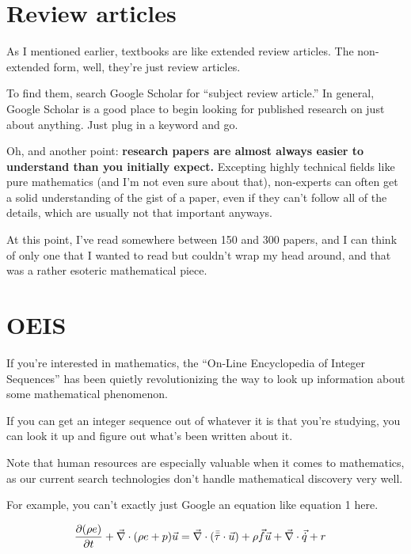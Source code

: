 \section{Review articles}

As I mentioned earlier, textbooks are like extended review articles. The
non-extended form, well, they're just review articles.

To find them, search Google Scholar for ``subject review article.'' In general,
Google Scholar is a good place to begin looking for published research on just
about anything. Just plug in a keyword and go.

Oh, and another point: \textbf{research papers are almost always easier to
  understand than you initially expect.} Excepting highly technical fields like
pure mathematics (and I'm not even sure about that), non-experts can often get a
solid understanding of the gist of a paper, even if they can't follow all of the
details, which are usually not that important anyways.

At this point, I've read somewhere between 150 and 300 papers, and I can think
of only one that I wanted to read but couldn't wrap my head around, and that was
a rather esoteric mathematical piece.

\section{OEIS}

If you're interested in mathematics, the ``On-Line Encyclopedia of Integer
Sequences'' has been quietly revolutionizing the way to look up information
about some mathematical phenomenon.

If you can get an integer sequence out of whatever it is that you're studying,
you can look it up and figure out what's been written about it.

Note that human resources are especially valuable when it comes to mathematics,
as our current search technologies don't handle mathematical discovery very
well.

For example, you can't exactly just Google an equation like equation 1 here.

\begin{align}
      \pdv{(\rho e)}{t}+\vec{\nabla}\cdot(\rho e+p)\vec{u} &= \vec{\nabla}\cdot(\Bar{\Bar{\tau}}\cdot\vec{u})+\rho\vec{f}\vec{u}+\vec{\nabla}\cdot\vec{\dot{q}}+r
\end{align}

